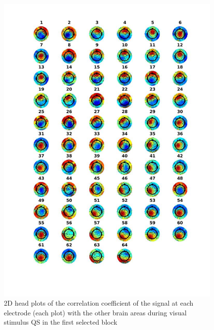\documentclass[a4paper]{article}
\begin{document}
\begin{figure}[H]
    \centering
    \includegraphics[width=16cm]{map1.jpg}
    \caption{2D head plots of the correlation coefficient of the signal at each electrode (each plot) with the other brain areas during visual stimulus QS in the first selected block}
    \label{fig:topomap1}
\end{figure}
\end{document}
